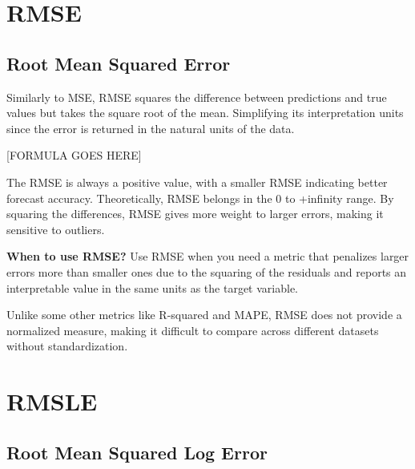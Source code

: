 \clearpage
\thispagestyle{regressionstyle}
\section{RMSE}
\subsection{Root Mean Squared Error}

Similarly to MSE, RMSE squares the difference between predictions and true values but takes the square root of the mean.
Simplifying its interpretation units since the error is returned in the natural units of the data.

\begin{center}
    [FORMULA GOES HERE]
\end{center}

The RMSE is always a positive value, with a smaller RMSE indicating better forecast accuracy.
Theoretically, RMSE belongs in the 0 to +infinity range. By squaring the differences, RMSE gives more weight to larger errors, making it sensitive to outliers.

\textbf{When to use RMSE?}
Use RMSE when you need a metric that penalizes larger errors more than smaller ones due to the squaring of the residuals and reports an
interpretable value in the same units as the target variable.

{
    \item Unlike some other metrics like R-squared and MAPE, RMSE does not provide a normalized measure, making it difficult to compare across different datasets without standardization.
}

\clearpage
\thispagestyle{regressionstyle}
\section{RMSLE}
\subsection{Root Mean Squared Log Error}

